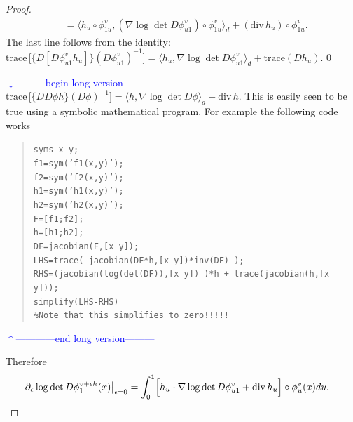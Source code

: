 \documentclass[noinfoline]{imsart}
\def\Ver{1}
\def\LongVer{0}
\begin{document}
\begin{proof}
\begin{align*}
 &=\bigl\langle  h_u\circ  \phi^v_{1u} ,(\nabla \log\det D\phi_{u1}^v )\circ  \phi^v_{1u} \bigr\rangle_d + (\text{div}\, h_u) \circ  \phi^v_{1u} .
\end{align*}
The last line follows from the identity: $\text{trace}\, \bigl[    \{D  [D\phi_{u1}^v h_u] \} (D\phi_{u1}^v)^{-1}\bigr]= \bigl\langle  h_u,\nabla \log\det D\phi_{u1}^v \bigr\rangle_d + \text{trace}(D h_u)$.
\if\Ver\LongVer{
{\flushleft\textcolor{blue}{$\downarrow$---------begin long version---------}}\newline
$\text{trace}\, \bigl[    \{D  D\phi h \} (D\phi)^{-1}\bigr]= \bigl\langle  h,\nabla \log\det D\phi \bigr\rangle_d + \text{div}\, h$. This is easily seen to be true using a symbolic mathematical program. For example the following {} code works
\begin{quote}
\tt{syms x y;\\
f1=sym('f1(x,y)');\\
f2=sym('f2(x,y)'); \\
h1=sym('h1(x,y)'); \\
h2=sym('h2(x,y)'); \\
F=[f1;f2]; \\
h=[h1;h2]; \\
DF=jacobian(F,[x y]);\\
LHS=trace( jacobian(DF*h,[x y])*inv(DF) );\\
RHS=(jacobian(log(det(DF)),[x y])  )*h + trace(jacobian(h,[x y]));\\
simplify(LHS-RHS)\\
\%Note that this simplifies to zero!!!!!}
\end{quote}
{\flushleft\textcolor{blue}{$\uparrow$------------end long version---------}}\newline
} \fi
Therefore
 \begin{align*}
\partial_\epsilon  \log \det D\phi_{1}^{v+\epsilon h }(x)\bigr|_{\epsilon = 0} & = \int_0^1  \Bigl[ h_u \cdot \nabla \log\det D\phi_{u1}^v   + \text{div}\, h_u  \Bigr]\circ  \phi^v_{u}(x)  du.
\end{align*}


\end{proof}
\end{document}
